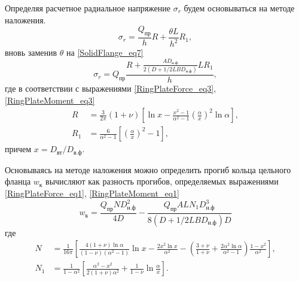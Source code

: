 Определяя расчетное радиальное напряжение ${\sigma}_r$ будем основываться на методе наложения.
\begin{equation}
  \label{SolidFlange_eq16}
  {\sigma}_r= \frac{Q_{\text{пр}}}{h}R + \frac{\theta L}{h^2}R_1,
\end{equation}
вновь заменив $\theta$ на \eqref{SolidFlange_eq7}
\begin{equation}
  \label{SolidFlange_eq17}
  {\sigma}_r= Q_{\text{пр}} \frac{R+ \displaystyle \frac{A D_{\text{н.ф}}}{2 \left( D+ 1/2 L B D_{\text{н.ф}} \right)} L R_1}{h},
\end{equation}
где в соответствии с выражениями \eqref{RingPlateForce_eq3}, \eqref{RingPlateMoment_eq3}
\begin{equation}
  \label{SolidFlange_eq18}
  \begin{split}
    R&=\frac{3}{2 \pi} \left(1+\nu \right) \left[\ln{x}-\frac{x^2-1}{{\alpha}^2-1}  {\left(\frac{\alpha}{x} \right)}^2  \ln{\alpha} \right],\\
    R_1&=\frac{6}{{\alpha}^2-1} \left[ \left(\frac{\alpha}{x}\right)^2  -1 \right],
  \end{split}
\end{equation}
причем $x=D_{\text{вт}}/D_{\text{в.ф}}$.

Основываясь на методе наложения можно определить прогиб кольца цельного фланца $w_{\text{к}}$ вычисляют как разность прогибов, определяемых выражениями \eqref{RingPlateForce_eq1}, \eqref{RingPlateMoment_eq1}
\begin{equation}
  \label{SolidFlange_eq19}
  w_{\text{к}}=\frac{Q_{\text{пр}} N D_{\text{н.ф}}^2}{4D}-\frac{Q_{\text{пр}} A L N_1 D_{\text{н.ф}}^3}{8 \left(D+ 1/2 L B D_{\text{н.ф}} \right) D}
\end{equation}
где
\begin{equation}
  \label{SolidFlange_eq20}
  \begin{split}
    N&=\frac{1}{16 \pi} \left[ \frac{4 \left( 1+\nu \right)\ln{\alpha}}{\left(1-\nu \right) \left({\alpha}^2 -1\right)}\ln{x} -\frac{2x^2 \ln{x}}{{\alpha}^2} -\left( \frac{3+\nu}{1+\nu}+\frac{2 {\alpha}^2 \ln{\alpha}}{{\alpha}^2 -1} \right)\frac{1-x^2}{{\alpha}^2} \right],\\
    N_1&=\frac{1}{1-{\alpha}^2} \left[ \frac{{\alpha}^2 -x^2}{2 \left(1+\nu \right) {\alpha}^2}+\frac{1}{1-\nu}\ln{\frac{\alpha}{x}} \right].
  \end{split}
\end{equation}





